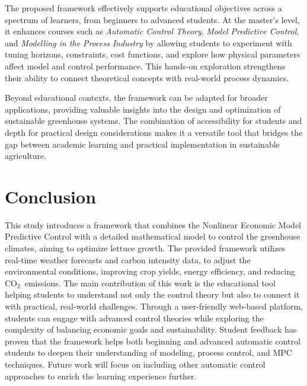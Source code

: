 \documentclass[conference]{IEEEtran}
\newcommand{\coo}{\ensuremath{\mathrm{CO_2}}}
\begin{document}
The proposed framework effectively supports educational objectives across a spectrum of learners, from beginners to advanced students. At the master's level, it enhances courses such as \textit{Automatic Control Theory}, \textit{Model Predictive Control}, and \textit{Modelling in the Process Industry} by allowing students to experiment with tuning horizons, constraints, cost functions, and explore how physical parameters affect model and control performance. This hands-on exploration strengthens their ability to connect theoretical concepts with real-world process dynamics.

Beyond educational contexts, the framework can be adapted for broader applications, providing valuable insights into the design and optimization of sustainable greenhouse systems. The combination of accessibility for students and depth for practical design considerations makes it a versatile tool that bridges the gap between academic learning and practical implementation in sustainable agriculture.

\section{Conclusion}
This study introduces a framework that combines the Nonlinear Economic Model Predictive Control with a detailed mathematical model to control the greenhouse climates, aiming to optimize lettuce growth. The provided framework utilizes real-time weather forecasts and carbon intensity data, to adjust the environmental conditions, improving crop yields, energy efficiency, and reducing \coo\ emissions.
%
The main contribution of this work is the educational tool helping students to understand not only the control theory but also to connect it with practical, real-world challenges. Through a user-friendly web-based platform, students can engage with advanced control theories while exploring the complexity of balancing economic goals and sustainability.
%
Student feedback has proven that the framework helps both beginning and advanced automatic control students to deepen their understanding of modeling, process control, and MPC techniques. Future work will focus on including other automatic control approaches to enrich the learning experience further.



\end{document}
